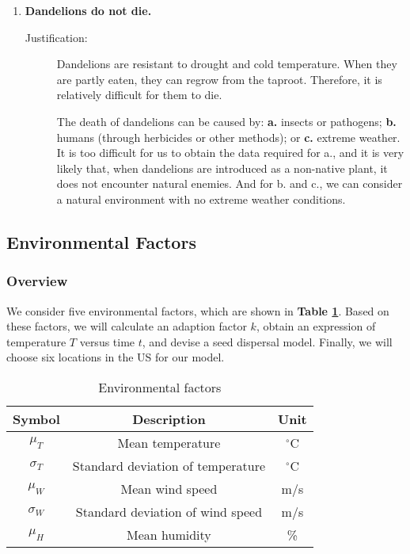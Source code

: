 \documentclass[12pt]{article}
\begin{document}
\begin{enumerate}
			\item \textbf{Dandelions do not die.}
			\vspace{-0.125in}
			\begin{description}
				\item[Justification:] Dandelions are resistant to drought and cold temperature.  When they are partly eaten, they can regrow from the taproot.  Therefore, it is relatively difficult for them to die.
				
				The death of dandelions can be caused by: \textbf{a.} insects or pathogens; \textbf{b.} humans (through herbicides or other methods); or \textbf{c.} extreme weather.  It is too difficult for us to obtain the data required for a., and it is very likely that, when dandelions are introduced as a non-native plant, it does not encounter natural enemies.  And for b. and c., we can consider a natural environment with no extreme weather conditions.  
			\end{description}
			
		\end{enumerate}
	
	\subsection{Environmental Factors}
	
		\subsubsection{Overview}
			
			We consider five environmental factors, which are shown in \textbf{Table \ref{tb:vars}}.  Based on these factors, we will calculate an adaption factor $k$, obtain an expression of temperature $T$ versus time $t$, and devise a seed dispersal model.  Finally, we will choose six locations in the US for our model.
			
			{
				\fontsize{10}{14}\selectfont
				{
					\begin{longtable}{ccc}
						\caption{Environmental factors}
						\label{tb:vars}\\
						\toprule
						Symbol&Description&Unit\\
						\toprule
						$\mu_T$&Mean temperature&$^\circ$C\\
						$\sigma_T$&Standard deviation of temperature&$^\circ$C\\
						$\mu_W$&Mean wind speed&m/s\\
						$\sigma_W$&Standard deviation of wind speed&m/s\\
						$\mu_H$&Mean humidity&\%\\
						\bottomrule
					\end{longtable}
				}
			}
			
\end{document}
